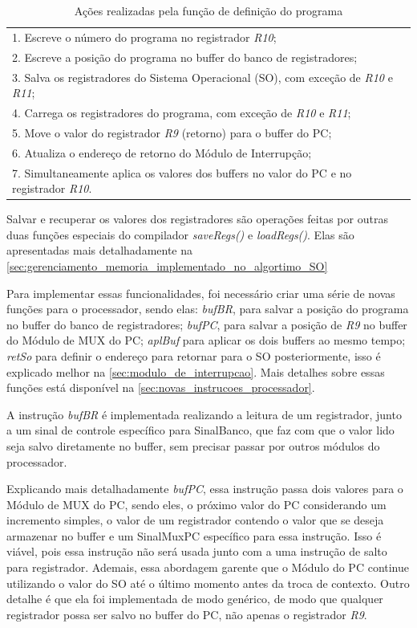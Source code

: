 \documentclass[
	12pt,				%
	oneside,
	a4paper,			%
	english,			%
	french,				%
	spanish,			%
	brazil,				%
	]{abntex2}
\begin{document}
\begin{table}[h!]
\centering
\caption{Ações realizadas pela função de definição do programa}
\label{tab:definir_programa}
\renewcommand{\arraystretch}{1.5}
\begin{tabularx}{\textwidth}{X}
\midrule
1. Escreve o número do programa no registrador \textit{R10}; \\
2. Escreve a posição do programa no buffer do banco de registradores; \\
3. Salva os registradores do Sistema Operacional (SO), com exceção de \textit{R10} e \textit{R11}; \\
4. Carrega os registradores do programa, com exceção de \textit{R10} e \textit{R11}; \\
5. Move o valor do registrador \textit{R9} (retorno) para o buffer do PC; \\
6. Atualiza o endereço de retorno do Módulo de Interrupção; \\
7. Simultaneamente aplica os valores dos buffers no valor do PC e no registrador \textit{R10}. \\
\bottomrule
\end{tabularx}
\end{table}

Salvar e recuperar os valores dos registradores são operações feitas por outras duas funções especiais do compilador \textit{saveRegs()} e \textit{loadRegs()}. Elas são apresentadas mais detalhadamente na \autoref{sec:gerenciamento_memoria_implementado_no_algortimo_SO}

Para implementar essas funcionalidades, foi necessário criar uma série de novas funções para o processador, sendo elas: \textit{bufBR}, para salvar a posição do programa no buffer do banco de registradores; \textit{bufPC}, para salvar a posição de \textit{R9} no buffer do Módulo de MUX do PC; \textit{aplBuf} para aplicar os dois buffers ao mesmo tempo; \textit{retSo} para definir o endereço para retornar para o SO posteriormente, isso é explicado melhor na \autoref{sec:modulo_de_interrupcao}. Mais detalhes sobre essas funções está disponível na \autoref{sec:novas_instrucoes_processador}.

A instrução \textit{bufBR} é implementada realizando a leitura de um registrador, junto a um sinal de controle específico para SinalBanco, que faz com que o valor lido seja salvo diretamente no buffer, sem precisar passar por outros módulos do processador.

Explicando mais detalhadamente \textit{bufPC}, essa instrução passa dois valores para o Módulo de MUX do PC, sendo eles, o próximo valor do PC considerando um incremento simples, o valor de um registrador contendo o valor que se deseja armazenar no buffer e um SinalMuxPC específico para essa instrução. Isso é viável, pois essa instrução não será usada junto com a uma instrução de salto para registrador. Ademais, essa abordagem garente que o Módulo do PC continue utilizando o valor do SO até o último momento antes da troca de contexto. Outro detalhe é que ela foi implementada de modo genérico, de modo que qualquer registrador possa ser salvo no buffer do PC, não apenas o registrador \textit{R9}.
\end{document}
